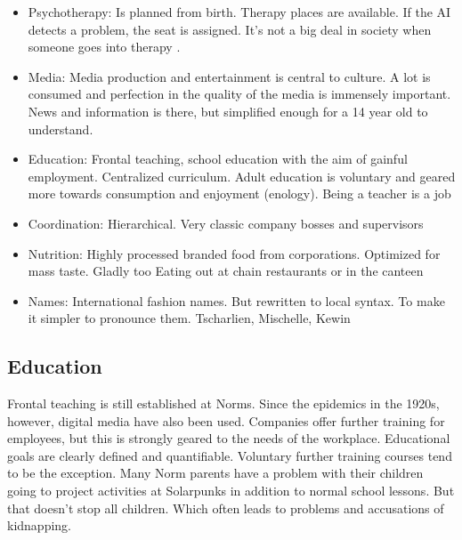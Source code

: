 \begin{itemize}
    \item Psychotherapy: Is planned from birth. Therapy places are available. If the AI detects a problem, the seat is assigned. It's not a big deal in society when someone goes into therapy .
    \item Media: Media production and entertainment is central to culture. A lot is consumed and perfection in the quality of the media is immensely important. News and information is there, but simplified enough for a 14 year old to understand.
    \item Education: Frontal teaching, school education with the aim of gainful employment. Centralized curriculum. Adult education is voluntary and geared more towards consumption and enjoyment (enology). Being a teacher is a job
    \item Coordination: Hierarchical. Very classic company bosses and supervisors
    \item Nutrition: Highly processed branded food from corporations. Optimized for mass taste. Gladly too Eating out at chain restaurants or in the canteen
    \item Names: International fashion names. But rewritten to local syntax. To make it simpler to pronounce them. Tscharlien, Mischelle, Kewin
\end{itemize}

\subsection{Education}
Frontal teaching is still established at Norms. Since the epidemics in the 1920s, however, digital media have also been used. Companies offer further training for employees, but this is strongly geared to the needs of the workplace.
Educational goals are clearly defined and quantifiable. Voluntary further training courses tend to be the exception. Many Norm parents have a problem with their children going to project activities at Solarpunks in addition to normal school lessons. But that doesn't stop all children. Which often leads to problems and accusations of kidnapping.

